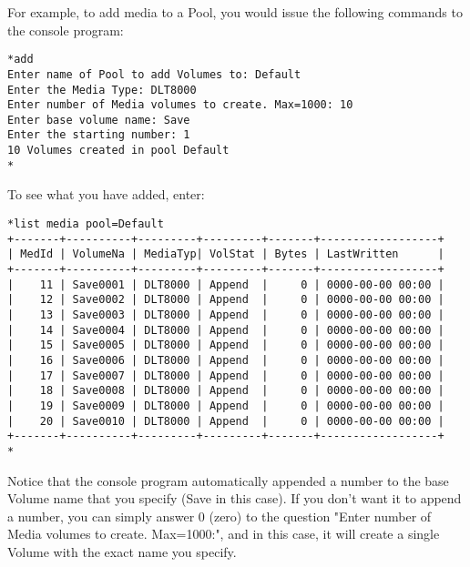 For example, to add media to a Pool, you would issue the following commands to
the console program:

\footnotesize
\begin{verbatim}
*add
Enter name of Pool to add Volumes to: Default
Enter the Media Type: DLT8000
Enter number of Media volumes to create. Max=1000: 10
Enter base volume name: Save
Enter the starting number: 1
10 Volumes created in pool Default
*
\end{verbatim}
\normalsize

To see what you have added, enter:

\footnotesize
\begin{verbatim}
*list media pool=Default
+-------+----------+---------+---------+-------+------------------+
| MedId | VolumeNa | MediaTyp| VolStat | Bytes | LastWritten      |
+-------+----------+---------+---------+-------+------------------+
|    11 | Save0001 | DLT8000 | Append  |     0 | 0000-00-00 00:00 |
|    12 | Save0002 | DLT8000 | Append  |     0 | 0000-00-00 00:00 |
|    13 | Save0003 | DLT8000 | Append  |     0 | 0000-00-00 00:00 |
|    14 | Save0004 | DLT8000 | Append  |     0 | 0000-00-00 00:00 |
|    15 | Save0005 | DLT8000 | Append  |     0 | 0000-00-00 00:00 |
|    16 | Save0006 | DLT8000 | Append  |     0 | 0000-00-00 00:00 |
|    17 | Save0007 | DLT8000 | Append  |     0 | 0000-00-00 00:00 |
|    18 | Save0008 | DLT8000 | Append  |     0 | 0000-00-00 00:00 |
|    19 | Save0009 | DLT8000 | Append  |     0 | 0000-00-00 00:00 |
|    20 | Save0010 | DLT8000 | Append  |     0 | 0000-00-00 00:00 |
+-------+----------+---------+---------+-------+------------------+
*
\end{verbatim}
\normalsize

Notice that the console program automatically appended a number to the base
Volume name that you specify (Save in this case). If you don't want it to
append a number, you can simply answer 0 (zero) to the question "Enter number
of Media volumes to create. Max=1000:", and in this case, it will create a
single Volume with the exact name you specify.
